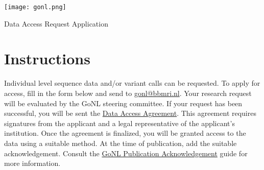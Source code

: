 \documentclass[a4paper,12pt]{article}
\begin{document}

\pagestyle{plain}

\begin{flushright}
  \texttt{[image: gonl.png]}
\end{flushright}

\vspace{0.6cm}

\begin{center}
  {\fontsize{21}{10}\selectfont Data Access Request Application}
\end{center}


\section*{Instructions}

Individual level sequence data and/or variant calls can be requested. To apply for access, fill in the form below and send to \href{mailto:gonl@bbmri.nl}{gonl@bbmri.nl}. Your research request will be evaluated by the GoNL steering committee. If your request has been successful, you will be sent the \href{https://nlgenome.nl/api/files/aaaac6lzvpcop6qwh32jd7yaae?alt=media}{Data Access Agreement}. This agreement requires signatures from the applicant and a legal representative of the applicant’s institution. Once the agreement is finalized, you will be granted access to the data using a suitable method. At the time of publication, add the suitable acknowledgement. Consult the \href{https://nlgenome.nl/api/files/aaaac5z7aijfr6qwh32jd7yaae?alt=media}{GoNL Publication Acknowledgement} guide for more information.
\end{document}
